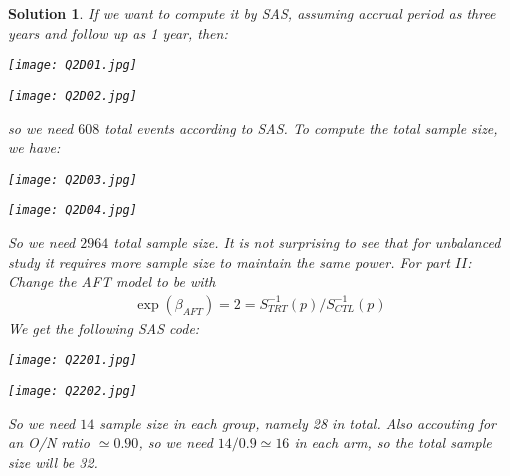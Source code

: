 \documentclass[11pt]{article}
\newtheorem{sol}{Solution}
\begin{document}
\begin{sol}
	If we want to compute it by SAS, assuming accrual period as three years and follow up as 1 year, then:
	\begin{center}
		\texttt{[image: Q2D01.jpg]}
	\end{center}
	\begin{center}
		\texttt{[image: Q2D02.jpg]}
	\end{center}
	so we need $608$ total events according to SAS.\vskip 2mm
	To compute the total sample size, we have:
	\begin{center}
		\texttt{[image: Q2D03.jpg]}
	\end{center}
	\begin{center}
		\texttt{[image: Q2D04.jpg]}
	\end{center}
	So we need $2964$ total sample size. It is not surprising to see that for unbalanced study it requires more sample size to maintain the same power.\vskip 2mm
	For part $II$:\vskip 2mm
	Change the AFT model to be with 
	\begin{align*}
		\exp(\beta_{AFT}) = 2 = S^{-1}_{TRT}(p)/S^{-1}_{CTL}(p)
	\end{align*}
	We get the following SAS code:
	\begin{center}
		\texttt{[image: Q2201.jpg]}
	\end{center}
	\begin{center}
		\texttt{[image: Q2202.jpg]}
	\end{center}
	So we need $14$ sample size in each group, namely 28 in total. Also accouting for an O/N ratio $\simeq 0.90$, so we need $14/0.9 \simeq 16$ in each arm, so the total sample size will be 32.
\end{sol}
\end{document}
